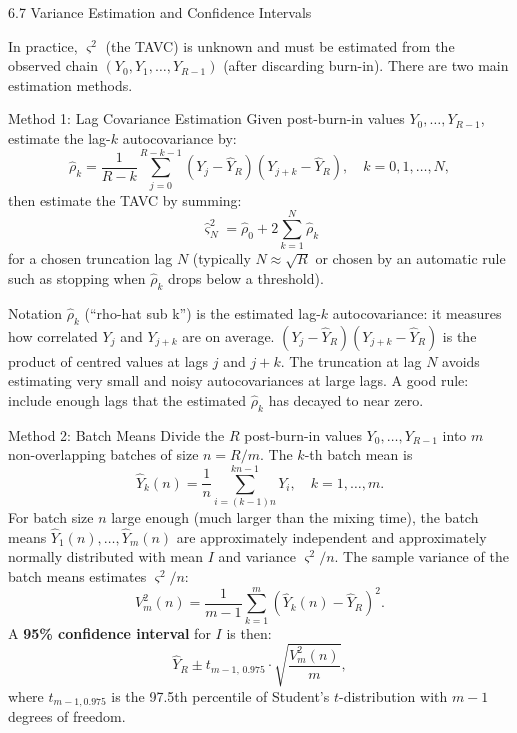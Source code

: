 \documentclass[aspectratio=169,10pt]{beamer}
\begin{document}
\begin{frame}[allowframebreaks]{6.7 Variance Estimation and Confidence Intervals}

In practice, $\varsigma^2$ (the TAVC) is unknown and must be estimated from the observed chain $(Y_0, Y_1, \ldots, Y_{R-1})$ (after discarding burn-in).
There are two main estimation methods.

\begin{block}{Method 1: Lag Covariance Estimation}
Given post-burn-in values $Y_0, \ldots, Y_{R-1}$, estimate the lag-$k$ autocovariance by:
\[
  \hat\rho_k = \frac{1}{R-k}\sum_{j=0}^{R-k-1}(Y_j - \hat{Y}_R)(Y_{j+k} - \hat{Y}_R), \quad k = 0, 1, \ldots, N,
\]
then estimate the TAVC by summing:
\[
  \hat\varsigma^2_N = \hat\rho_0 + 2\sum_{k=1}^{N} \hat\rho_k
\]
for a chosen truncation lag $N$ (typically $N \approx \sqrt{R}$ or chosen by an automatic rule such as stopping when $\hat\rho_k$ drops below a threshold).
\end{block}

\begin{block}{Notation}
$\hat\rho_k$ (``rho-hat sub k'') is the estimated lag-$k$ autocovariance: it measures how correlated $Y_j$ and $Y_{j+k}$ are on average.
$(Y_j - \hat{Y}_R)(Y_{j+k} - \hat{Y}_R)$ is the product of centred values at lags $j$ and $j+k$.
The truncation at lag $N$ avoids estimating very small and noisy autocovariances at large lags.
A good rule: include enough lags that the estimated $\hat\rho_k$ has decayed to near zero.
\end{block}

\framebreak

\begin{block}{Method 2: Batch Means}
Divide the $R$ post-burn-in values $Y_0, \ldots, Y_{R-1}$ into $m$ non-overlapping batches of size $n = R/m$.
The $k$-th batch mean is
\[
  \hat{Y}_k(n) = \frac{1}{n}\sum_{i=(k-1)n}^{kn-1} Y_i, \quad k = 1, \ldots, m.
\]
For batch size $n$ large enough (much larger than the mixing time), the batch means $\hat{Y}_1(n), \ldots, \hat{Y}_m(n)$ are approximately independent and approximately normally distributed with mean $I$ and variance $\varsigma^2/n$.
The sample variance of the batch means estimates $\varsigma^2/n$:
\[
  V_m^2(n) = \frac{1}{m-1}\sum_{k=1}^m (\hat{Y}_k(n) - \hat{Y}_R)^2.
\]
A \textbf{95\% confidence interval} for $I$ is then:
\[
  \hat{Y}_R \pm t_{m-1,\, 0.975} \cdot \sqrt{\frac{V_m^2(n)}{m}},
\]
where $t_{m-1,0.975}$ is the 97.5th percentile of Student's $t$-distribution with $m-1$ degrees of freedom.
\end{block}


\end{frame}
\end{document}
